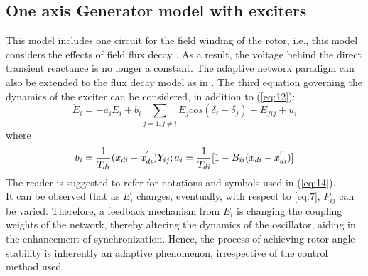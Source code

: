 \documentclass{ifacconf}
\begin{document}
\subsection{One axis Generator model with exciters }
This model includes one circuit for the field winding of the rotor, i.e., this model considers the effects of field flux decay \citep{Chiang}. As a result, the voltage behind the direct transient reactance is no longer a constant.
The adaptive network paradigm can also be extended to the flux decay model as in \citep{Chen}.
The third equation governing the dynamics of the exciter can be considered, in addition to (\ref {eq:12}):
\begin{equation}\label{eq:14}
\dot E_{i}=-a_{i}E_{i}+b_{i} \sum _{j=1,j \neq i} E_{j} cos(\delta_{i}-\delta_{j} )+E_{fij}+u_{i}
\end{equation}
where \\
\begin{equation}
b_{i}=\frac{1}{T_{di}} (x_{di}-x_{di}^{'})Y_{ij} ; \\ \nonumber
a_{i}=\frac{1}{T_{di}}[1-B_{ii}(x_{di}-x_{di}^{'})]  \nonumber
\end{equation}
The reader is suggested to refer \citep{Ort} for notations and symbols used in (\ref{eq:14}).\\
It can be observed that as $E_{i}$ changes, eventually, with respect to \ref{eq:7}, $P_{ij} $ can be varied. Therefore, 
a feedback mechanism from $ E_{i}$ is changing the coupling weights of the network, thereby altering the dynamics of the oscillator, aiding in the enhancement of synchronization. Hence, the process of achieving rotor angle stability is inherently an adaptive phenomenon, irrespective of the control method used.  
\end{document}
